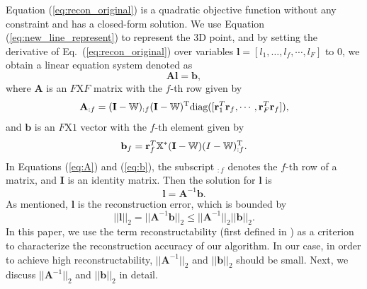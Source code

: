 Equation (\ref{eq:recon_original}) is a quadratic objective function without any constraint and has a closed-form solution. We use Equation (\ref{eq:new_line_represent}) to represent the 3D point, and by setting the derivative of Eq.~(\ref{eq:recon_original}) over variables $\mathbf{l} = [l_1,\dots,l_f,\cdots,l_F ]$ to 0, we obtain a linear equation system denoted as
\begin{equation}
\mathbf{A}\mathbf{l} = \mathbf{b},	\label{eq:alb}
\end{equation}
where $\mathbf{A}$ is an $F \text{X} F$ matrix with the $f$-th row given by
\begin{equation}
\mathbf{A}_{:f} = (\mathbf{I}-\mathbb W)_{:f}(\mathbf{I}-\mathbb W)^\text{T} \text{diag}([\mathbf{r}^T_1 \mathbf{r}_f, \cdots, \mathbf{r}_F^T \mathbf{r}_f] ),
\label{eq:A}
\end{equation}
and $\mathbf{b}$ is an $F \text{X} 1$ vector with the $f$-th element given by
\begin{equation}
\mathbf{b}_{f} = \mathbf{r}_f^T \mathbb X^* (\mathbf{I}-\mathbb W) (I-\mathbb W)_{:f}^{\text{T}}.
\label{eq:b}
\end{equation}
In Equations (\ref{eq:A}) and (\ref{eq:b}), the subscript $_{:f}$ denotes the $f$-th row of a matrix, and $\mathbf{I}$ is an identity matrix. Then the solution for $\mathbf{l}$ is
\begin{equation}
\mathbf{l} = \mathbf{A}^{-1}\mathbf{b}. 
\label{eq:a_minus_1_b}
\end{equation}
As mentioned, $\mathbf{l}$ is the reconstruction error, 
which is bounded by 
\begin{equation}
||\mathbf{l}||_2= ||\mathbf{A}^{-1} \mathbf{b}||_2 \leq ||\mathbf{A}^{-1}||_2 ||\mathbf{b}||_2.
\end{equation}
In this paper, we use the term reconstructability (first defined in \cite{Park_ECCV2010}) as a criterion to characterize the reconstruction accuracy of our algorithm. 
In our case, in order to achieve high reconstructability, $||\mathbf{A}^{-1}||_2$ and $||\mathbf{b}||_2$ should be small. Next, we discuss $||\mathbf{A}^{-1}||_2$ and $||\mathbf{b}||_2$ in detail.


